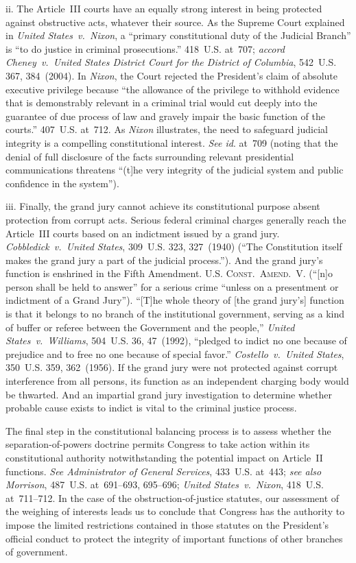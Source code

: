 ii. The Article~III courts have an equally strong interest in being protected against obstructive acts, whatever their source.
As the Supreme Court explained in \textit{United States~v.\ Nixon}, a ``primary constitutional duty of the Judicial Branch'' is ``to do justice in criminal prosecutions.'' 418~U.S. at~707;
\textit{accord Cheney~v.\ United States District Court for the District of Columbia}, 542~U.S. 367, 384~(2004).
In \textit{Nixon}, the Court rejected the President's claim of absolute executive privilege because ``the allowance of the privilege to withhold evidence that is demonstrably relevant in a criminal trial would cut deeply into the guarantee of due process of law and gravely impair the basic function of the courts.'' 407~U.S. at~712.
As \textit{Nixon} illustrates, the need to safeguard judicial integrity is a compelling constitutional interest.
\textit{See id}. at~709 (noting that the denial of full disclosure of the facts surrounding relevant presidential communications threatens ``(t]he very integrity of the judicial system and public confidence in the system'').

iii. Finally, the grand jury cannot achieve its constitutional purpose absent protection from corrupt acts.
Serious federal criminal charges generally reach the Article~III courts based on an indictment issued by a grand jury.
\textit{Cobbledick~v.\ United States}, 309~U.S. 323, 327~(1940) (``The Constitution itself makes the grand jury a part of the judicial process.'').
And the grand jury's function is enshrined in the Fifth Amendment.
\textsc{U.S. Const.\ Amend.~V}. (``[n]o person shall be held to answer'' for a serious crime ``unless on a presentment or indictment of a Grand Jury'').
``[T]he whole theory of [the grand jury's] function is that it belongs to no branch of the institutional government, serving as a kind of buffer or referee between the Government and the people,'' \textit{United States~v.\ Williams}, 504~U.S. 36, 47~(1992), ``pledged to indict no one because of prejudice and to free no one because of special favor.''
\textit{Costello~v.\ United States}, 350~U.S. 359, 362~(1956).
If the grand jury were not protected against corrupt interference from all persons, its function as an independent charging body would be thwarted.
And an impartial grand jury investigation to determine whether probable cause exists to indict is vital to the criminal justice process.

\hr

The final step in the constitutional balancing process is to assess whether the separation-of-powers doctrine permits Congress to take action within its constitutional authority notwithstanding the potential impact on Article~II functions.
\textit{See Administrator of General Services}, 433~U.S. at~443;
\textit{see also Morrison}, 487~U.S. at~691--693, 695--696;
\textit{United States~v.\ Nixon}, 418~U.S. at~711--712.
In the case of the obstruction-of-justice statutes, our assessment of the weighing of interests leads us to conclude that Congress has the authority to impose the limited restrictions contained in those statutes on the President's official conduct to protect the integrity of important functions of other branches of government.

